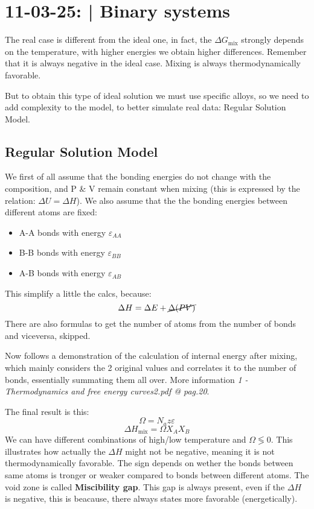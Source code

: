 \section{11-03-25: | Binary systems}

The real case is different from the ideal one, in fact, the $\Delta G_{\text{mix}}$ strongly depends on the temperature, with higher energies we obtain higher differences. Remember that it is always negative in the ideal case. Mixing is always thermodynamically favorable.

But to obtain this type of ideal solution we must use specific alloys, so we need to add complexity to the model, to better simulate real data: Regular Solution Model.

\subsection{Regular Solution Model}

We first of all assume that the bonding energies do not change with the composition, and P \& V remain constant when mixing (this is expressed by the relation: $\Delta U = \Delta H$).
We also assume that the the bonding energies between different atoms are fixed:
\begin{itemize}
    \item A-A bonds with energy $\varepsilon_{AA}$
    \item B-B bonds with energy $\varepsilon_{BB}$
    \item A-B bonds with energy $\varepsilon_{AB}$
\end{itemize} 
This simplify a little the calcs, because:
\begin{equation}
    \Delta H = \Delta E + \cancel{\Delta(PV)}
\end{equation}
There are also formulas to get the number of atoms from the number of bonds and viceversa, skipped.

Now follows a demonstration of the calculation of internal energy after mixing, which mainly considers the 2 original values and correlates it to the number of bonds, essentially summating them all over. More information \textit{1 - Thermodynamics and free energy curves2.pdf @ pag.20}.

The final result is this:
\begin{equation}
    \Omega = N_az\varepsilon
\end{equation}
\begin{equation}
    \Delta H_{\text{mix}} = \Omega X_A X_B
\end{equation}
We can have different combinations of high/low temperature and $\Omega \lessgtr 0$. This illustrates how actually the $\Delta H$ might not be negative, meaning it is not thermodynamically favorable. The sign depends on wether the bonds between same atoms is tronger or weaker compared to bonds between different atoms. The void zone is called \textbf{Miscibility gap}. This gap is always present, even if the $\Delta H$ is negative, this is beacause, there always states more favorable (energetically). 

